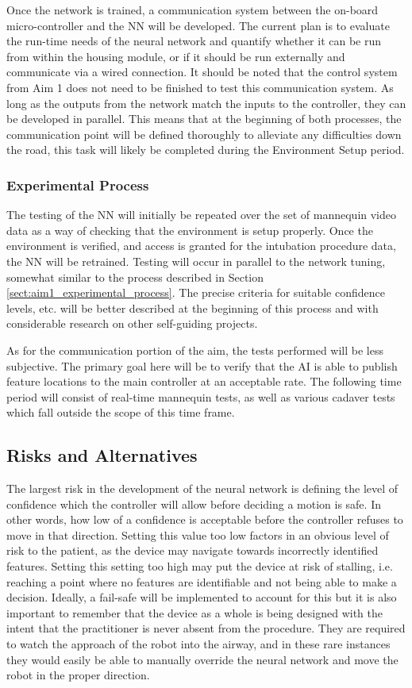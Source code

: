 		Once the network is trained, a communication system between the on-board micro-controller and the NN will be developed. The current plan is to evaluate the run-time needs of the neural network and quantify whether it can be run from within the housing module, or if it should be run externally and communicate via a wired connection. It should be noted that the control system from Aim 1 does not need to be finished to test this communication system. As long as the outputs from the network match the inputs to the controller, they can be developed in parallel. This means that at the beginning of both processes, the communication point will be defined thoroughly to alleviate any difficulties down the road, this task will likely be completed during the Environment Setup period.
	
	\subsubsection{Experimental Process}
		The testing of the NN will initially be repeated over the set of mannequin video data as a way of checking that the environment is setup properly. Once the environment is verified, and access is granted for the intubation procedure data, the NN will be retrained. Testing will occur in parallel to the network tuning, somewhat similar to the process described in Section \ref{sect:aim1_experimental_process}. The precise criteria for suitable confidence levels, etc. will be better described at the beginning of this process and with considerable research on other self-guiding projects.
		
		As for the communication portion of the aim, the tests performed will be less subjective. The primary goal here will be to verify that the AI is able to publish feature locations to the main controller at an acceptable rate. The following time period will consist of real-time mannequin tests, as well as various cadaver tests which fall outside the scope of this time frame.

\subsection{Risks and Alternatives}

	The largest risk in the development of the neural network is defining the level of confidence which the controller will allow before deciding a motion is safe. In other words, how low of a confidence is acceptable before the controller refuses to move in that direction. Setting this value too low factors in an obvious level of risk to the patient, as the device may navigate towards incorrectly identified features. Setting this setting too high may put the device at risk of stalling, i.e. reaching a point where no features are identifiable and not being able to make a decision. Ideally, a fail-safe will be implemented to account for this but it is also important to remember that the device as a whole is being designed with the intent that the practitioner is never absent from the procedure. They are required to watch the approach of the robot into the airway, and in these rare instances they would easily be able to manually override the neural network and move the robot in the proper direction.